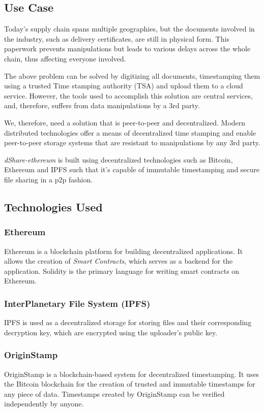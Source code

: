 \subsection{Use Case}
Today's supply chain spans multiple geographies, but the documents involved in the industry, such as delivery certificates, are still in physical form. This paperwork prevents manipulations but leads to various delays across the whole chain, thus affecting everyone involved\cite{ibm:sc:1}.

The above problem can be solved by digitizing all documents, timestamping them using a trusted Time stamping authority (TSA) and upload them to a cloud service. However, the tools used to accomplish this solution are central services, and, therefore, suffers from data manipulations by a 3rd party.

We, therefore, need a solution that is peer-to-peer and decentralized. Modern distributed technologies offer a means of decentralized time stamping and enable peer-to-peer storage systems that are resistant to manipulations by any 3rd party.

\textit{dShare-ethereum} is built using decentralized technologies such as Bitcoin\cite{nakamoto2008bitcoin}, Ethereum\cite{buterin2014ethereum} and IPFS\cite{benet2014ipfs} such that it's capable of immutable timestamping and secure file sharing in a p2p fashion.

\subsection{Technologies Used}
\subsubsection{Ethereum}
Ethereum\cite{buterin2014ethereum} is a blockchain platform for building decentralized applications. It allows the creation of \textit{Smart Contracts}, which serves as a backend for the application. Solidity\cite{github:solidity:1} is the primary language for writing smart contracts on Ethereum.

\subsubsection{InterPlanetary File System (IPFS)}
IPFS is used as a decentralized storage for storing files and their corresponding decryption key, which are encrypted using the uploader's public key.

\subsubsection{OriginStamp}\label{sec:originstamp}
OriginStamp\cite{hepp2018originstamp} is a blockchain-based system for decentralized timestamping. It uses the Bitcoin blockchain for the creation of trusted and immutable timestamps for any piece of data. Timestamps created by OriginStamp can be verified independently by anyone.

